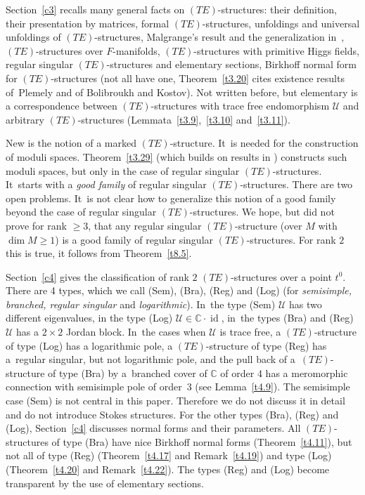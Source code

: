 \documentclass[pdftex]{sigma}%
\numberwithin{equation}{section}
\numberwithin{figure}{section}
\newcommand{\C}{{\mathbb C}}
\newcommand{\UU}{{\mathcal U}}
\DeclareMathOperator{\id}{id}
\begin{document}
Section~\ref{c3} recalls many general facts on
$(TE)$-structures: their definition, their presentation
by matrices, formal $(TE)$-structures, unfoldings and
universal unfoldings of $(TE)$-structures, Malgrange's
result and the generalization in~\cite{HM04},
$(TE)$-structures over $F$-manifolds, $(TE)$-structures
with primitive Higgs fields, regular singular $(TE)$-structures
and elementary sections, Birkhoff normal form for
$(TE)$-structures (not all have one, Theorem~\ref{t3.20} cites
existence results of~Ple\-mely and of Bolibroukh and Kostov).
Not written before, but elementary is a correspondence
between $(TE)$-structures with trace free endomorphism
$\UU$ and arbitrary $(TE)$-structures (Lem\-mata~\ref{t3.9},~\ref{t3.10} and~\ref{t3.11}).

New is the notion of a marked $(TE)$-structure. It~is needed for the construction of moduli spaces.
Theorem~\ref{t3.29} (which builds on results in
\cite{HS10}) constructs such moduli spaces, but
only in the case of regular singular $(TE)$-structures. It~starts with a {\it good family} of regular
singular $(TE)$-structures. There are two open problems. It~is not clear how to generalize this notion of a good
family beyond the case of regular singular $(TE)$-structures.
We hope, but did not prove for rank $\geq 3$, that
any regular singular $(TE)$-structure (over $M$ with
$\dim M\geq 1$) is a good family of regular singular
$(TE)$-structures. For rank $2$ this is true, it follows
from Theorem~\ref{t8.5}.

Section~\ref{c4} gives the classification of rank $2$
$(TE)$-structures over a point $t^0$. There are 4 types,
which we call (Sem), (Bra), (Reg) and (Log)
(for {\it semisimple, branched, regular singular} and
{\it logarithmic}). In~the type (Sem) $\UU$ has two
different eigenvalues, in the type (Log) $\UU\in\C\cdot\id$,
in~the types (Bra) and (Reg) $\UU$ has a $2\times 2$
Jordan block. In~the cases when $\UU$ is trace free,
a $(TE)$-structure of type (Log) has a logarithmic pole,
a $(TE)$-structure of type (Reg) has a~regular singular,
but not logarithmic pole, and the pull back of a~$(TE)$-structure of type (Bra) by a~branched cover of $\C$
of order 4 has a meromorphic connection with
semisimple pole of order~3 (see Lemma~\ref{t4.9}).
The semisimple case (Sem) is not central in this paper.
Therefore we do not discuss it in detail
and do not introduce Stokes structures. For the other types
(Bra), (Reg) and (Log), Section~\ref{c4} discusses normal forms
and their parameters. All $(TE)$-structures of type (Bra)
have nice Birkhoff normal forms (Theorem~\ref{t4.11}),
but not all of type (Reg) (Theorem~\ref{t4.17} and Remark~\ref{t4.19}) and type (Log) (Theorem~\ref{t4.20} and
Remark~\ref{t4.22}). The types (Reg) and (Log) become
transparent by the use of elementary sections.
\end{document}
